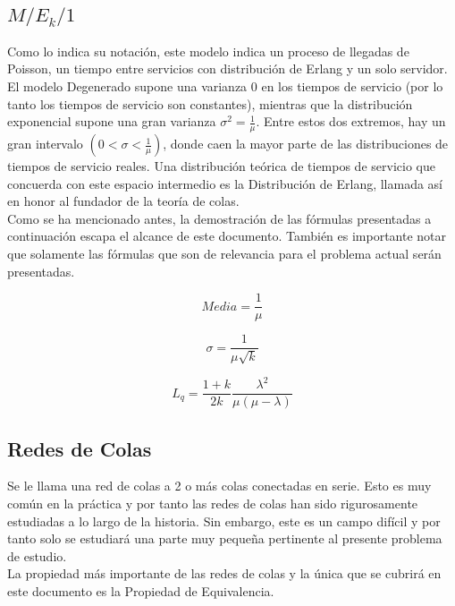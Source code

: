 \documentclass{article}
\begin{document}
\subsection{$M/E_{k}/1$}
Como lo indica su notación, este modelo indica un proceso de llegadas de Poisson,
un tiempo entre servicios con distribución de Erlang y un solo servidor. \\
El modelo Degenerado supone una varianza 0 en los tiempos de servicio (por lo tanto
los tiempos de servicio son constantes), mientras que la distribución exponencial
supone una gran varianza $\sigma^{2} = \frac{1}{\mu}$. Entre estos dos extremos,
hay un gran intervalo $\left(0 < \sigma < \frac{1}{\mu} \right)$, donde caen la
mayor parte de las distribuciones de tiempos de servicio reales. Una distribución 
teórica de tiempos de servicio que concuerda con este espacio intermedio es 
la Distribución de Erlang, llamada así en honor al fundador de la teoría de colas.\\
Como se ha mencionado antes, la demostración de las fórmulas presentadas a continuación
escapa el alcance de este documento. También es importante notar que solamente 
las fórmulas que son de relevancia para el problema actual serán presentadas.

\begin{Large}
\begin{equation}
	\label{eq14:media}
	Media = \frac{1}{\mu}
\end{equation}
\end{Large}

\begin{Large}
\begin{equation}
	\label{eq15:desviacion}
	\sigma = \frac{1}{\mu \sqrt{k}}
\end{equation}
\end{Large}
\begin{Large}
\begin{equation}
	\label{eq12:llq}
	L_{q} = \frac{1+k}{2 k} \frac{\lambda^{2}}{\mu \left( \mu - \lambda \right)}
\end{equation}
\end{Large}
\subsection{Redes de Colas}
Se le llama una red de colas a 2 o más colas conectadas en serie. Esto es muy común 
en la práctica y por tanto las redes de colas han sido rigurosamente estudiadas a
lo largo de la historia. Sin embargo, este es un campo difícil y por tanto 
solo se estudiará una parte muy pequeña pertinente al presente problema de estudio. \\
La propiedad más importante de las redes de colas y la única que se cubrirá en este
documento es la Propiedad de Equivalencia.
\end{document}
